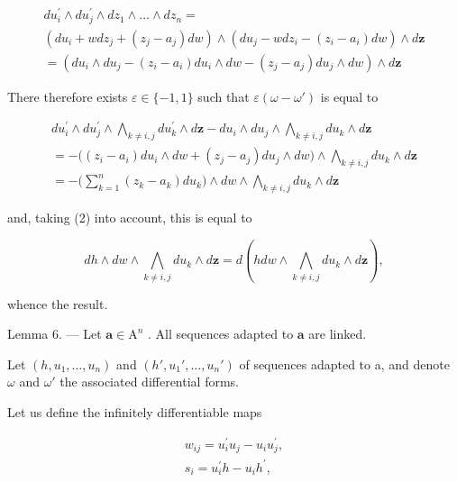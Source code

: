 \[
\begin{array}{l} d u _ {i} ^ {\prime} \wedge d u _ {j} ^ {\prime} \wedge d z _ {1} \wedge \dots \wedge d z _ {n} = \\ \left(d u _ {i} + w d z _ {j} + (z _ {j} - a _ {j}) d w\right) \wedge \left(d u _ {j} - w d z _ {i} - (z _ {i} - a _ {i}) d w\right) \wedge d \boldsymbol {z} \\ = \left(d u _ {i} \wedge d u _ {j} - (z _ {i} - a _ {i}) d u _ {i} \wedge d w - (z _ {j} - a _ {j}) d u _ {j} \wedge d w\right) \wedge d \boldsymbol {z} \end{array}
\]

There therefore exists \(\varepsilon\in\{-1,1\}\) such that \(\varepsilon(\omega-\omega')\) is equal to

\[
\begin{array}{l} d u _ {i} ^ {\prime} \wedge d u _ {j} ^ {\prime} \wedge \bigwedge_ {k \neq i, j} d u _ {k} ^ {\prime} \wedge d \boldsymbol {z} - d u _ {i} \wedge d u _ {j} \wedge \bigwedge_ {k \neq i, j} d u _ {k} \wedge d \boldsymbol {z} \\ = - \Big ((z _ {i} - a _ {i}) d u _ {i} \wedge d w + (z _ {j} - a _ {j}) d u _ {j} \wedge d w \Big) \wedge \bigwedge_ {k \neq i, j} d u _ {k} \wedge d \boldsymbol {z} \\ = - \Big (\sum_ {k = 1} ^ {n} (z _ {k} - a _ {k})   d u _ {k} \Big) \wedge d w \wedge \bigwedge_ {k \neq i, j} d u _ {k} \wedge d \boldsymbol {z} \end{array}
\]

and, taking (2) into account, this is equal to

\[
d h \wedge d w \wedge \bigwedge_ {k \neq i, j} d u _ {k} \wedge d \boldsymbol {z} = d \left(h d w \wedge \bigwedge_ {k \neq i, j} d u _ {k} \wedge d \boldsymbol {z}\right),
\]

whence the result.

Lemma 6. — Let \(\mathbf{a} \in \mathrm{A}^n\) . All sequences adapted to \(\mathbf{a}\) are linked.

Let \((h,u_{1},\ldots,u_{n})\) and \((h',u_{1}',\ldots,u_{n}')\) of sequences adapted to a, and denote \(\omega\) and \(\omega'\) the associated differential forms.

Let us define the infinitely differentiable maps

\[
\begin{array}{c} {w _ {i j} = u _ {i} ^ {\prime} u _ {j} - u _ {i} u _ {j} ^ {\prime},} \\ {s _ {i} = u _ {i} ^ {\prime} h - u _ {i} h ^ {\prime},} \end{array}
\]

